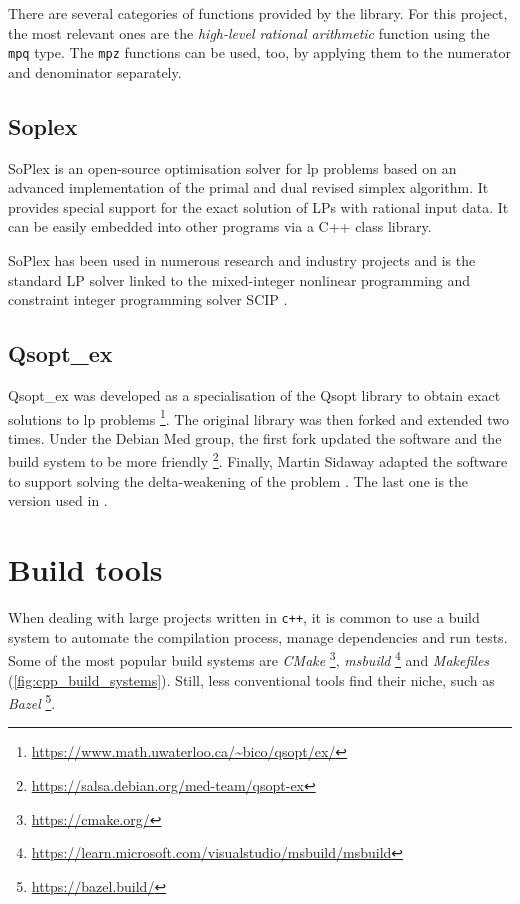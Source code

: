There are several categories of functions provided by the library.
For this project, the most relevant ones are the \textit{high-level rational arithmetic} function using the \texttt{mpq} type.
The \texttt{mpz} functions can be used, too, by applying them to the numerator and denominator separately.

\subsection*{Soplex}

SoPlex is an open-source optimisation solver for \gls{lp} problems based on an advanced implementation of the primal and dual revised simplex algorithm.
It provides special support for the exact solution of LPs with rational input data.
It can be easily embedded into other programs via a C++ class library.

SoPlex has been used in numerous research and industry projects and is the standard LP solver linked to the mixed-integer nonlinear programming and constraint integer programming solver SCIP \cite{man:soplex}.

\subsection*{Qsopt\_ex}

Qsopt\_ex was developed as a specialisation of the Qsopt library to obtain exact solutions to \gls{lp} problems \footnote{\url{https://www.math.uwaterloo.ca/~bico/qsopt/ex/}}.
The original library was then forked and extended two times.
Under the Debian Med group, the first fork updated the software and the build system to be more friendly \footnote{\url{https://salsa.debian.org/med-team/qsopt-ex}}.
Finally, Martin Sidaway adapted the software to support solving the delta-weakening of the problem \cite{repo:qsopt-ex}.
The last one is the version used in \dlinear.

\section{Build tools}

When dealing with large projects written in \texttt{c++}, it is common to use a build system to automate the compilation process, manage dependencies and run tests.
Some of the most popular build systems are \textit{CMake} \footnote{\url{https://cmake.org/}}, \textit{msbuild} \footnote{\url{https://learn.microsoft.com/visualstudio/msbuild/msbuild}} and \textit{Makefiles} (\autoref{fig:cpp_build_systems}).
Still, less conventional tools find their niche, such as \textit{Bazel} \footnote{\url{https://bazel.build/}}.

